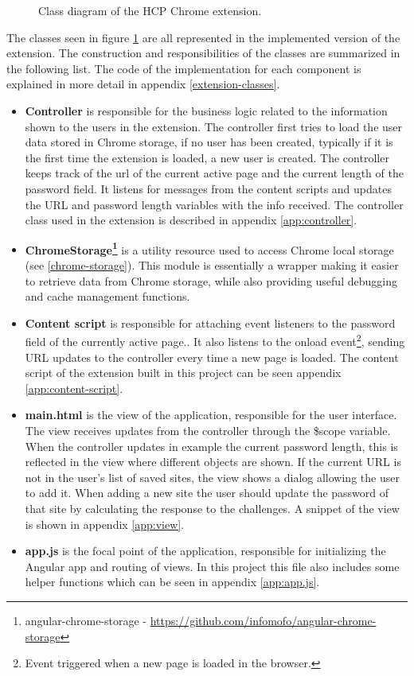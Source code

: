 \begin{figure}[ht]
    \centering
    \caption{Class diagram of the HCP Chrome extension.}
    \label{class-diagram}
\end{figure}

\par The classes seen in figure \ref{class-diagram} are all represented in the implemented version of the extension. The construction and responsibilities of the classes are summarized in the following list. The code of the implementation for each component is explained in more detail in appendix \ref{extension-classes}.

\begin{itemize}
    \item \textbf{Controller} is responsible for the business logic related to the information shown to the users in the extension. The controller first tries to load the user data stored in Chrome storage, if no user has been created, typically if it is the first time the extension is loaded, a new user is created. The controller keeps track of the url of the current active page and the current length of the password field. It listens for messages from the content scripts and updates the URL and password length variables with the info received. The controller class used in the extension is described in appendix \ref{app:controller}.
    \item \textbf{ChromeStorage\footnote{angular-chrome-storage - \url{https://github.com/infomofo/angular-chrome-storage}}} is a utility resource used to access Chrome local storage (see \autoref{chrome-storage}). This module is essentially a wrapper making it easier to retrieve data from Chrome storage, while also providing useful debugging and cache management functions.
    \item \textbf{Content script} is responsible for attaching event listeners to the password field of the currently active page.. It also listens to the onload event\footnote{Event triggered when a new page is loaded in the browser.}, sending URL updates to the controller every time a new page is loaded. The content script of the extension built in this project can be seen appendix \ref{app:content-script}.
    \item \textbf{main.html} is the view of the application, responsible for the user interface. The view receives updates from the controller through the \$scope variable. When the controller updates in example the current password length, this is reflected in the view where different objects are shown. If the current URL is not in the user's list of saved sites, the view shows a dialog allowing the user to add it. When adding a new site the user should update the password of that site by calculating the response to the challenges. A snippet of the view is shown in appendix \ref{app:view}. 
    \item \textbf{app.js} is the focal point of the application, responsible for initializing the Angular app and routing of views. In this project this file also includes some helper functions which can be seen in appendix \ref{app:app.js}.
\end{itemize}

